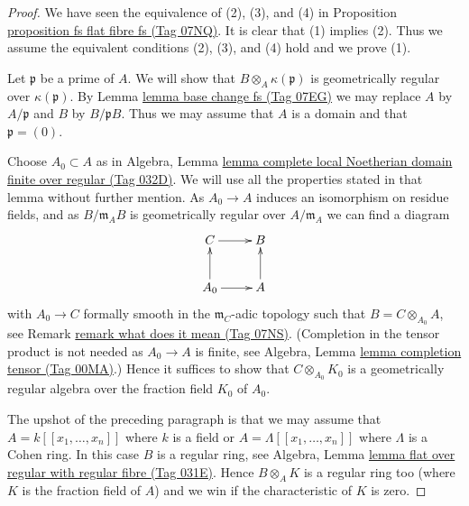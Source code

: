 \documentclass{amsart}
\theoremstyle{plain}
\theoremstyle{definition}
\theoremstyle{remark}
\numberwithin{equation}{subsection}
\begin{document}
\begin{proof}
We have seen the equivalence of (2), (3), and (4) in
Proposition \href{https://stacks.math.columbia.edu/tag/07NQ}{proposition fs flat fibre fs (Tag 07NQ)}.
It is clear that (1) implies (2).
Thus we assume the equivalent conditions (2), (3), and (4) hold
and we prove (1).

\medskip\noindent
Let $\mathfrak p$ be a prime of $A$. We will show that
$B \otimes_A \kappa(\mathfrak p)$ is geometrically regular
over $\kappa(\mathfrak p)$.
By Lemma \href{https://stacks.math.columbia.edu/tag/07EG}{lemma base change fs (Tag 07EG)}
we may replace $A$ by $A/\mathfrak p$ and $B$ by $B/\mathfrak pB$.
Thus we may assume that $A$ is a domain and that $\mathfrak p = (0)$.

\medskip\noindent
Choose $A_0 \subset A$ as in Algebra, Lemma
\href{https://stacks.math.columbia.edu/tag/032D}{lemma complete local Noetherian domain finite over regular (Tag 032D)}.
We will use all the properties stated in that lemma without further mention.
As $A_0 \to A$ induces an isomorphism on residue fields, and as
$B/\mathfrak m_A B$ is geometrically regular over $A/\mathfrak m_A$
we can find a diagram
$$
\xymatrix{
C \ar[r] & B \\
A_0 \ar[r] \ar[u] & A \ar[u]
}
$$
with $A_0 \to C$ formally smooth in the $\mathfrak m_C$-adic topology
such that $B = C \otimes_{A_0} A$, see Remark \href{https://stacks.math.columbia.edu/tag/07NS}{remark what does it mean (Tag 07NS)}.
(Completion in the tensor product is not needed as $A_0 \to A$ is
finite, see Algebra, Lemma \href{https://stacks.math.columbia.edu/tag/00MA}{lemma completion tensor (Tag 00MA)}.)
Hence it suffices to show that $C \otimes_{A_0} K_0$
is a geometrically regular algebra over the fraction field $K_0$ of $A_0$.

\medskip\noindent
The upshot of the preceding paragraph is that we may assume that
$A = k[[x_1, \ldots, x_n]]$ where $k$ is a field or
$A = \Lambda[[x_1, \ldots, x_n]]$ where $\Lambda$ is a Cohen ring.
In this case $B$ is a regular ring, see
Algebra, Lemma \href{https://stacks.math.columbia.edu/tag/031E}{lemma flat over regular with regular fibre (Tag 031E)}.
Hence $B \otimes_A K$ is a regular ring too (where $K$ is the
fraction field of $A$) and we win
if the characteristic of $K$ is zero.


\end{proof}
\end{document}
